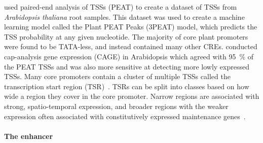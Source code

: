 \textcite*{mortonPairedEndAnalysisTranscription2014} used paired\hyp{}end analysis of TSSs (PEAT) to create a
dataset of TSSs from \textit{Arabidopsis thaliana} root samples. This
dataset was used to create a machine learning model called the Plant
PEAT Peaks (3PEAT) model, which predicts the TSS probability at any
given nucleotide. The majority of core plant promoters were found to be
TATA\hyp{}less, and instead contained many other CREs. \textcite*{thieffryCharacterizationArabidopsisThaliana2020} conducted cap\hyp{}analysis gene expression (CAGE) in Arabidopsis which agreed with \SI{95}{\percent} of the PEAT TSSs and was also more sensitive at
detecting more lowly expressed TSSs. Many core promoters contain a
cluster of multiple TSSs called the transcription start region (TSR)~\autocite{carninciGenomewideAnalysisMammalian2006,rachMotifCompositionConservation2009,niPairedendSequencingStrategy2010}. TSRs can be split into classes based on how wide a
region they cover in the core promoter. Narrow regions are associated
with strong, spatio\hyp{}temporal expression, and broader regions with the
weaker expression often associated with constitutively expressed
maintenance genes~\autocite{mortonPairedEndAnalysisTranscription2014}.

\paragraph{The enhancer}\label{the-enhancer}

